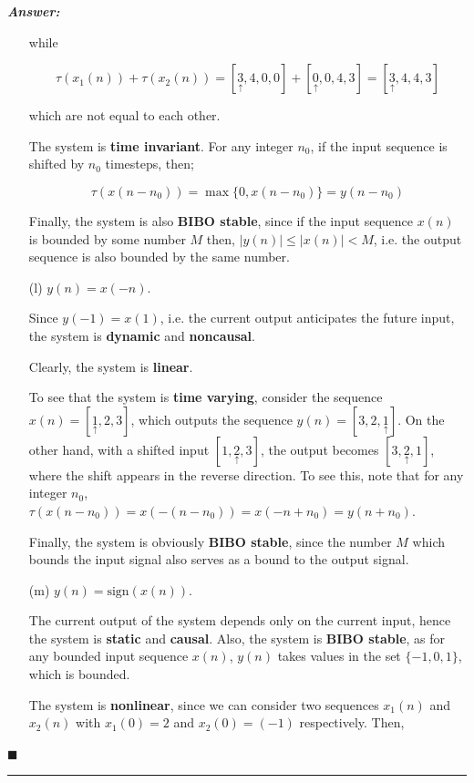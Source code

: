 \documentclass[12pt]{article}
\theoremstyle{definition}
\newenvironment{answer}{
    \textbf{\textit{Answer:}} \qquad
}{\hfill $\blacksquare$ \\ \begin{center}
    \rule{0.6\linewidth}{0.5px}    
\end{center}
}
\begin{document}
\begin{answer}
\begin{enumerate}
        while

        $$
        \tau(x_1(n)) + \tau(x_2(n)) = [\underset{\uparrow}{3}, 4, 0, 0] + [\underset{\uparrow}{0}, 0, 4, 3] = [\underset{\uparrow}{3}, 4, 4, 3]
        $$

        which are not equal to each other.

        The system is \textbf{time invariant}. For any integer $n_0$, if the input sequence is shifted by $n_0$ timesteps, then;

        $$
        \tau(x(n-n_0)) = \max\{ 0, x(n-n_0) \} = y(n-n_0)
        $$

        Finally, the system is also \textbf{BIBO stable}, since if the input sequence $x(n)$ is bounded by some number $M$ then, $\vert y(n) \vert \leq \vert x(n) \vert < M$, i.e. the output sequence is also bounded by the same number.

        \item[(l)] $y(n) = x(-n)$.
        
        Since $y(-1) = x(1)$, i.e. the current output anticipates the future input, the system is \textbf{dynamic} and \textbf{noncausal}.

        Clearly, the system is \textbf{linear}.

        To see that the system is \textbf{time varying}, consider the sequence $x(n) = [\underset{\uparrow}{1}, 2, 3]$, which outputs the sequence $y(n) = [3, 2, \underset{\uparrow}{1}]$. On the other hand, with a shifted input $[1, \underset{\uparrow}{2}, 3]$, the output becomes $[3, \underset{\uparrow}{2}, 1]$, where the shift appears in the reverse direction. To see this, note that for any integer $n_0$, $\tau(x(n-n_0)) = x(-(n-n_0)) = x(-n + n_0) = y(n + n_0)$.

        Finally, the system is obviously \textbf{BIBO stable}, since the number $M$ which bounds the input signal also serves as a bound to the output signal.

        \item[(m)] $y(n) = \text{sign}(x(n))$.
        
        The current output of the system depends only on the current input, hence the system is \textbf{static} and \textbf{causal}. Also, the system is \textbf{BIBO stable}, as for any bounded input sequence $x(n)$, $y(n)$ takes values in the set $\{ -1, 0, 1 \}$, which is bounded.

        The system is \textbf{nonlinear}, since we can consider two sequences $x_1(n)$ and $x_2(n)$ with $x_1(0) = 2$ and $x_2(0) = (-1)$ respectively. Then,


\end{enumerate}
\end{answer}
\end{document}
